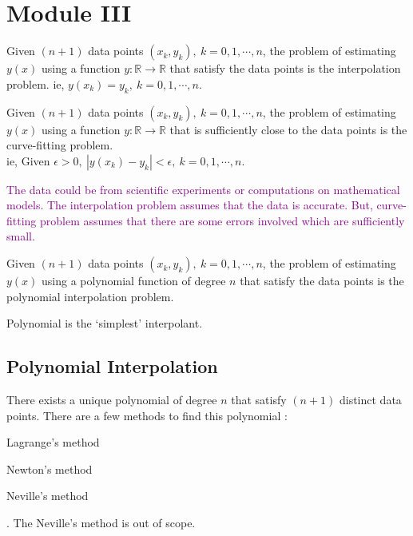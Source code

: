 \chapter{Module III}
\begin{definition}
	Given $(n+1)$ data points $(x_k, y_k),\ k = 0,1,\cdots,n$, the problem of estimating $y(x)$ using a function $y : \mathbb{R} \to \mathbb{R}$ that satisfy the data points is the interpolation problem. ie, $y(x_k) = y_k,\ k = 0,1,\cdots,n$.
\end{definition}
\begin{definition}
	Given $(n+1)$ data points $(x_k,y_k),\ k = 0,1,\cdots,n$, the problem of estimating $y(x)$ using a function $y : \mathbb{R} \to \mathbb{R}$ that is sufficiently close to the data points is the curve-fitting problem.\\ ie, Given $\epsilon > 0,\ |y(x_k)-y_k| < \epsilon,\ k = 0,1,\cdots,n$.
\end{definition}
\begin{remark}
	\textcolor{purple}{The data could be from scientific experiments or computations on mathematical models. The interpolation problem assumes that the data is accurate. But, curve-fitting problem assumes that there are some errors involved which are sufficiently small.}
\end{remark}
\begin{definition}
	Given $(n+1)$ data points $(x_k,y_k),\ k = 0,1,\cdots,n$, the problem of estimating $y(x)$ using a polynomial function of degree $n$ that satisfy the data points is the polynomial interpolation problem.
\end{definition}
\begin{remark}
	Polynomial is the `simplest' interpolant.\cite[3.2]{kiusalaas}
\end{remark}

\section{Polynomial Interpolation}
There exists a unique polynomial of degree $n$ that satisfy $(n+1)$ distinct data points. There are a few methods to find this polynomial : 
\begin{enumerate*}
	\item Lagrange's method
	\item Newton's method
	\item Neville's method
\end{enumerate*}. The Neville's method is out of scope.

